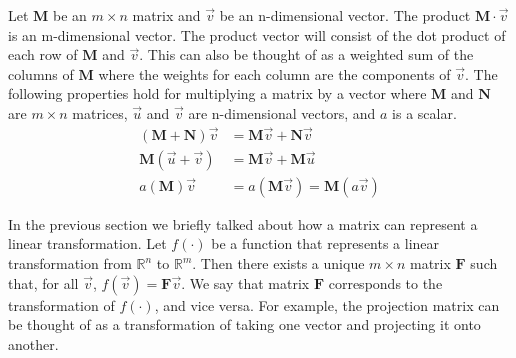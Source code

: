\documentclass[12pt]{article}
\begin{document}
Let $\mathbf{M}$ be an $m\times n$ matrix and $\vec{v}$ be an n-dimensional vector. The product $\mathbf{M}\cdot\vec{v}$ is an m-dimensional vector. The product vector will consist of the dot product of each row of $\mathbf{M}$ and $\vec{v}$. This can also be thought of as a weighted sum of the columns of $\mathbf{M}$ where the weights for each column are the components of $\vec{v}$. The following properties hold for multiplying a matrix by a vector where $\mathbf{M}$ and $\mathbf{N}$ are $m\times n$ matrices, $\vec{u}$ and $\vec{v}$ are n-dimensional vectors, and $a$ is a scalar.
\begin{align*}
(\mathbf{M}+\mathbf{N})\vec{v} &= \mathbf{M}\vec{v}+\mathbf{N}\vec{v} \\
\mathbf{M}(\vec{u}+\vec{v}) &= \mathbf{M}\vec{v} + \mathbf{M}\vec{u} \\
a(\mathbf{M})\vec{v} &= a(\mathbf{M}\vec{v}) = \mathbf{M}(a\vec{v})
\end{align*}

In the previous section we briefly talked about how a matrix can represent a linear transformation. Let $f(\cdot)$ be a function that represents a linear transformation from $\mathbb{R}^n$ to $\mathbb{R}^m$. Then there exists a unique $m\times n$ matrix $\mathbf{F}$ such that, for all $\vec{v}$, $f(\vec{v})=\mathbf{F}\vec{v}$. We say that matrix $\mathbf{F}$ corresponds to the transformation of $f(\cdot)$, and vice versa. For example, the projection matrix can be thought of as a transformation of taking one vector and projecting it onto another. \\
\end{document}
